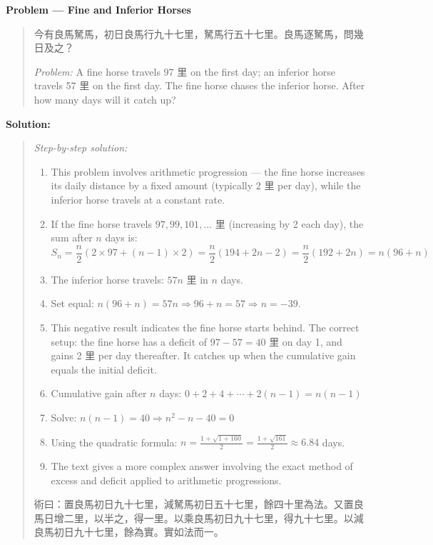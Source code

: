 \documentclass[11pt,a4paper]{article}
\newcommand{\zh}[1]{{#1}}
\newenvironment{chproblem}[1][]{%
  \par\medskip\noindent\textbf{\textcolor{sectioncolor}{#1}}\par\nopagebreak
  \begin{quote}\small
}{%
  \end{quote}\medskip
}
\newenvironment{chsolution}{%
  \par\medskip\noindent\textbf{\textcolor{notecolor}{Solution:}}\par\nopagebreak
  \begin{quote}\small
}{%
  \end{quote}\medskip
}
\newenvironment{stepbystep}{%
  \par\smallskip\noindent\textit{Step-by-step solution:}\par\nopagebreak
  \begin{enumerate}[leftmargin=2em,label=\textbf{Step \arabic*:},ref=\arabic*]
}{%
  \end{enumerate}\medskip
}
\begin{document}
\begin{chproblem}[Problem --- Fine and Inferior Horses]
\zh{今有良馬駑馬，初日良馬行九十七里，駑馬行五十七里。良馬逐駑馬，問幾日及之？}

\medskip
\textit{Problem:} A fine horse travels 97 \zh{里} on the first day; an inferior
horse travels 57 \zh{里} on the first day. The fine horse chases the inferior
horse. After how many days will it catch up?
\end{chproblem}

\begin{chsolution}
\begin{stepbystep}
\item This problem involves arithmetic progression --- the fine horse
increases its daily distance by a fixed amount (typically 2 \zh{里} per day),
while the inferior horse travels at a constant rate.

\item If the fine horse travels $97, 99, 101, \ldots$ \zh{里} (increasing by
2 each day), the sum after $n$ days is:
\[
S_n = \frac{n}{2}(2 \times 97 + (n-1) \times 2) = \frac{n}{2}(194 + 2n - 2) = \frac{n}{2}(192 + 2n) = n(96 + n)
\]

\item The inferior horse travels: $57n$ \zh{里} in $n$ days.

\item Set equal: $n(96 + n) = 57n \Rightarrow 96 + n = 57 \Rightarrow n = -39$.

\item This negative result indicates the fine horse starts behind. The
correct setup: the fine horse has a deficit of $97 - 57 = 40$ \zh{里} on day
1, and gains 2 \zh{里} per day thereafter. It catches up when the cumulative
gain equals the initial deficit.

\item Cumulative gain after $n$ days: $0 + 2 + 4 + \cdots + 2(n-1) = n(n-1)$

\item Solve: $n(n-1) = 40 \Rightarrow n^2 - n - 40 = 0$

\item Using the quadratic formula: $n = \frac{1 + \sqrt{1 + 160}}{2} =
\frac{1 + \sqrt{161}}{2} \approx 6.84$ days.

\item The text gives a more complex answer involving the exact method of
excess and deficit applied to arithmetic progressions.
\end{stepbystep}

\zh{術曰：置良馬初日九十七里，減駑馬初日五十七里，餘四十里為法。又置良馬日增二里，以半之，得一里。以乘良馬初日九十七里，得九十七里。以減良馬初日九十七里，餘為實。實如法而一。}
\end{chsolution}
\end{document}
